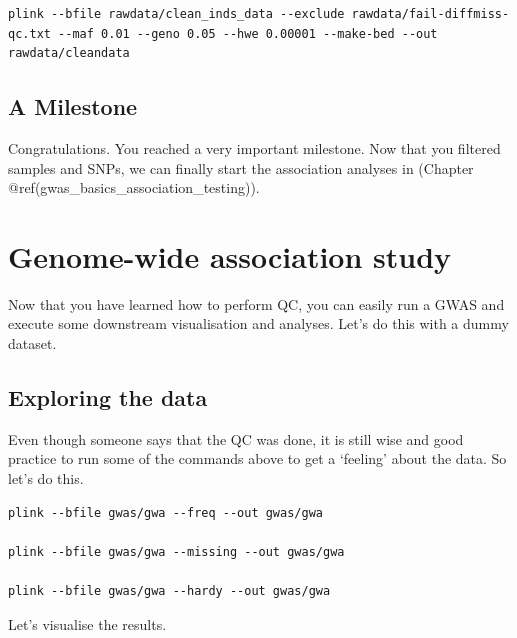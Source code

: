 \documentclass[
]{book}
\begin{document}
\begin{verbatim}
plink --bfile rawdata/clean_inds_data --exclude rawdata/fail-diffmiss-qc.txt --maf 0.01 --geno 0.05 --hwe 0.00001 --make-bed --out rawdata/cleandata
\end{verbatim}

\hypertarget{a-milestone}{%
\section{A Milestone}\label{a-milestone}}

Congratulations. You reached a very important milestone. Now that you filtered samples and SNPs, we can finally start the association analyses in (Chapter @ref(gwas\_basics\_association\_testing)).

\hypertarget{genome-wide-association-study}{%
\chapter{Genome-wide association study}\label{genome-wide-association-study}}

Now that you have learned how to perform QC, you can easily run a GWAS and execute some downstream visualisation and analyses. Let's do this with a dummy dataset.

\hypertarget{exploring-the-data}{%
\section{Exploring the data}\label{exploring-the-data}}

Even though someone says that the QC was done, it is still wise and good practice to run some of the commands above to get a `feeling' about the data. So let's do this.

\begin{verbatim}
plink --bfile gwas/gwa --freq --out gwas/gwa

plink --bfile gwas/gwa --missing --out gwas/gwa

plink --bfile gwas/gwa --hardy --out gwas/gwa
\end{verbatim}

Let's visualise the results.
\end{document}
